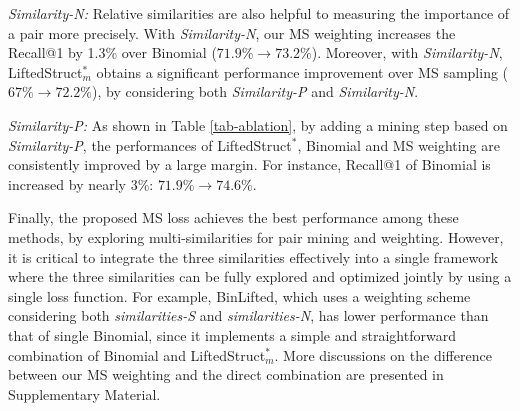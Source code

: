 \documentclass[10pt,twocolumn,letterpaper]{article}
\begin{document}
{\it Similarity-N:} Relative similarities are also helpful to measuring the importance of a pair more precisely. With {\it Similarity-N}, our MS weighting increases the Recall@1 by 1.3\% over Binomial ($71.9\% \rightarrow73.2\%$). Moreover, with {\it Similarity-N}, LiftedStruct$_m^*$ obtains a significant performance improvement over MS sampling ($ 67\%\rightarrow72.2\%$), by considering both {\it Similarity-P} and {\it Similarity-N}.

{\it Similarity-P:} As shown in Table \ref{tab-ablation}, by adding a mining step based on {\it Similarity-P}, the performances of LiftedStruct$^*$, Binomial and MS weighting are consistently improved by a large margin. For instance, Recall@1 of Binomial is increased by nearly 3\%: $71.9\% \rightarrow 74.6\%$.  

Finally, the proposed MS loss achieves the best performance among these methods, by exploring multi-similarities for pair mining and weighting. However, it is critical to integrate the three similarities effectively into a single framework where the three similarities can be fully explored and optimized jointly by using a single loss function. For example, BinLifted, which uses a weighting scheme considering both {\it similarities-S} and {\it similarities-N}, has lower performance than that of single Binomial, since it implements a simple and straightforward combination of Binomial and LiftedStruct$_m^*$. More discussions on the difference between our MS weighting and the direct combination are presented in Supplementary Material. 
\end{document}
